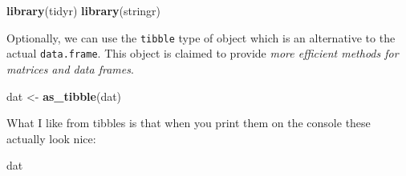 \documentclass[]{book}
\newenvironment{Shaded}{\begin{snugshade}}{\end{snugshade}}
\newcommand{\KeywordTok}[1]{\textcolor[rgb]{0.13,0.29,0.53}{\textbf{#1}}}
\newcommand{\StringTok}[1]{\textcolor[rgb]{0.31,0.60,0.02}{#1}}
\newcommand{\NormalTok}[1]{#1}
\theoremstyle{definition}
\theoremstyle{definition}
\theoremstyle{definition}
\theoremstyle{remark}
\begin{document}
\begin{Shaded}
\begin{Highlighting}[]
\KeywordTok{library}\NormalTok{(tidyr)}
\KeywordTok{library}\NormalTok{(stringr)}
\end{Highlighting}
\end{Shaded}

Optionally, we can use the \texttt{tibble} type of object which is an
alternative to the actual \texttt{data.frame}. This object is claimed to
provide \emph{more efficient methods for matrices and data frames}.

\begin{Shaded}
\begin{Highlighting}[]
\NormalTok{dat <-}\StringTok{ }\KeywordTok{as_tibble}\NormalTok{(dat)}
\end{Highlighting}
\end{Shaded}

What I like from tibbles is that when you print them on the console
these actually look nice:

\begin{Shaded}
\begin{Highlighting}[]
\NormalTok{dat}
\end{Highlighting}
\end{Shaded}
\end{document}
